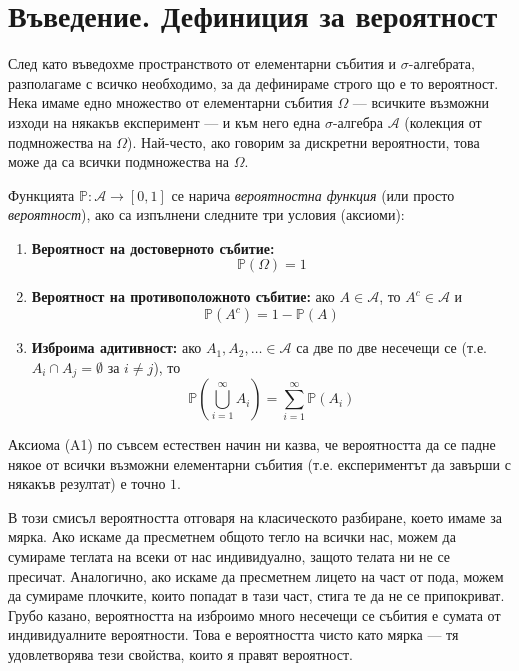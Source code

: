 \section{Въведение. Дефиниция за вероятност}

След като въведохме пространството от елементарни събития и $\sigma$-алгебрата, разполагаме с всичко необходимо, за да дефинираме строго що е то вероятност. Нека имаме едно множество от елементарни събития $\Omega$ — всичките възможни изходи на някакъв експеримент — и към него една $\sigma$-алгебра $\mathcal{A}$ (колекция от подмножества на $\Omega$). Най-често, ако говорим за дискретни вероятности, това може да са всички подмножества на $\Omega$.

\begin{keydefn}\label{def:probability}
Функцията $\mathbb{P}: \mathcal{A} \to [0, 1]$ се нарича \emph{вероятностна функция} (или просто \emph{вероятност}), ако са изпълнени следните три условия (аксиоми):
\begin{enumerate}
    \item[(A1)] \textbf{Вероятност на достоверното събитие:}
    \[ \mathbb{P}(\Omega) = 1 \]

    \item[(A2)] \textbf{Вероятност на противоположното събитие:} ако $A \in \mathcal{A}$, то $A^c \in \mathcal{A}$ и
    \[ \mathbb{P}(A^c) = 1 - \mathbb{P}(A) \]

    \item[(A3)] \textbf{Изброима адитивност:} ако $A_1, A_2, \dots \in \mathcal{A}$ са две по две несечещи се (т.е. $A_i \cap A_j = \emptyset$ за $i \neq j$), то
    \[ \mathbb{P}\left(\bigcup_{i=1}^{\infty} A_i\right) = \sum_{i=1}^{\infty} \mathbb{P}(A_i) \]
\end{enumerate}
\end{keydefn}

Аксиома (A1) по съвсем естествен начин ни казва, че вероятността да се падне някое от всички възможни елементарни събития (т.е. експериментът да завърши с някакъв резултат) е точно $1$.

В този смисъл вероятността отговаря на класическото разбиране, което имаме за мярка. Ако искаме да пресметнем общото тегло на всички нас, можем да сумираме теглата на всеки от нас индивидуално, защото телата ни не се пресичат. Аналогично, ако искаме да пресметнем лицето на част от пода, можем да сумираме плочките, които попадат в тази част, стига те да не се припокриват. Грубо казано, вероятността на изброимо много несечещи се събития е сумата от индивидуалните вероятности. Това е вероятността чисто като мярка — тя удовлетворява тези свойства, които я правят вероятност.

